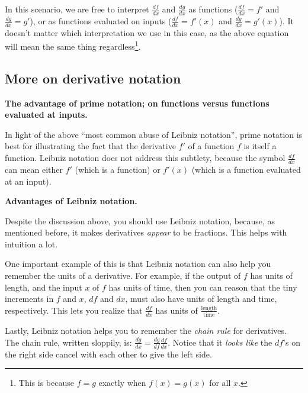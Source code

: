 \documentclass{article}
\begin{document}
In this scenario, we are free to interpret $\frac{df}{dx}$ and $\frac{dg}{dx}$ as functions ($\frac{df}{dx} = f'$ and $\frac{dg}{dx} = g'$), or as functions evaluated on inputs ($\frac{df}{dx} = f'(x)$ and $\frac{dg}{dx} = g'(x)$). It doesn't matter which interpretation we use in this case, as the above equation will mean the same thing regardless\footnote{This is because $f = g$ exactly when $f(x) = g(x)$ for all $x$.}.

\subsection*{More on derivative notation}

\indent \textbf{The advantage of prime notation; on functions versus functions evaluated at inputs.} 
         
In light of the above ``most common abuse of Leibniz notation'', prime notation is best for illustrating the fact that the derivative $f'$ of a function $f$ is itself a function. Leibniz notation does not address this subtlety, because the symbol $\frac{df}{dx}$ can mean either $f'$ (which is a function) or $f'(x)$ (which is a function evaluated at an input).

\vspace{.5cm}

\textbf{Advantages of Leibniz notation.} 
         
Despite the discussion above, you should use Leibniz notation, because, as mentioned before,  it makes derivatives \textit{appear} to be fractions. This helps with intuition a lot.
         
One important example of this is that Leibniz notation can also help you remember the units of a derivative. For example, if the output of $f$ has units of length, and the input $x$ of $f$ has units of time, then you can reason that the tiny increments in $f$ and $x$, $df$ and $dx$, must also have units of length and time, respectively. This lets you realize that $\frac{df}{dx}$ has units of $\frac{\text{length}}{\text{time}}$.
         
Lastly, Leibniz notation helps you to remember the \textit{chain rule} for derivatives. The chain rule, written sloppily, is: $\frac{dg}{dx} = \frac{dg}{df} \frac{df}{dx}$. Notice that it \textit{looks like} the $df$'s on the right side cancel with each other to give the left side.
         
\vspace{.5cm}     
    
\end{document}
